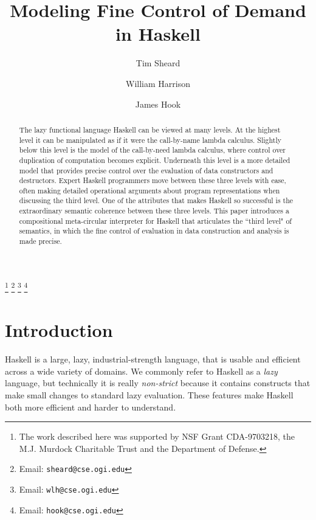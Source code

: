 \documentclass{entcs} \usepackage{entcsmacro}
\begin{document}
\begin{frontmatter}
  \title{Modeling Fine Control of Demand in Haskell} 
      \author{Tim Sheard}
      \author{William Harrison}
      \author{James Hook}
      \address{Pacific Software Research Center\\
               Oregon Graduate Institute\\
               Beaverton, Oregon}                
      \thanks[ALL]{The work described here was supported by NSF Grant CDA-9703218, 
                   the M.J. Murdock Charitable Trust and the Department of Defense.} 
      \thanks[myemail]{Email: {\texttt{\normalshape sheard@cse.ogi.edu}}} 
      \thanks[coemail]{Email: {\texttt{\normalshape wlh@cse.ogi.edu}}}
      \thanks[triemail]{Email: {\texttt{\normalshape hook@cse.ogi.edu}}}
    
    
\begin{abstract} 
The lazy functional language Haskell can be viewed at many levels.  At the 
highest level it can be manipulated as if it were the call-by-name lambda 
calculus.  Slightly below this level is the model of the call-by-need 
lambda calculus, where control over duplication of computation becomes 
explicit. Underneath this level is a more detailed model that provides 
precise control over the evaluation of data constructors and 
destructors.  Expert Haskell programmers move between these three levels 
with ease, often making detailed operational arguments about program 
representations when discussing the third level.  One of the attributes 
that makes Haskell so successful is the extraordinary semantic coherence 
between these three levels.  This paper introduces a compositional 
meta-circular interpreter for Haskell that articulates the ``third level" of 
semantics, in which the fine control of evaluation in data construction and 
analysis is made precise.

\end{abstract}
\end{frontmatter}

\section{Introduction}\label{intro}

Haskell is a large, lazy, industrial-strength language, that is usable and
efficient across a wide variety of domains. We commonly refer to Haskell as
a {\em lazy} language, but technically it is really {\em non-strict}
because it contains constructs that make small changes to standard lazy
evaluation. These features make Haskell both more efficient
and harder to understand.
\end{document}
